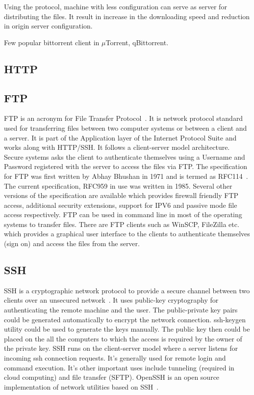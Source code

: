 {     Using the protocol, machine with less configuration can serve as
     server for distributing the files. It result in increase in the
     downloading speed and reduction in origin server configuration.

     Few popular bittorrent client in $\mu$Torrent, qBittorrent.

     \pv

\subsection{HTTP}
\subsection{FTP }

FTP is an acronym for File Transfer Protocol~\cite{www-ftp-wiki}. It
is network protocol standard used for transferring files between two
computer systems or between a client and a server. It is part of the
Application layer of the Internet Protocol Suite and works along with
HTTP/SSH. It follows a client-server model architecture. Secure
systems asks the client to authenticate themselves using a Username
and Password registered with the server to access the files via
FTP. The specification for FTP was first written by Abhay Bhushan in
1971 and is termed as RFC114~\cite{www-rfc114}. The current
specification, RFC959 in use was written in 1985. Several other
versions of the specification are available which provides firewall
friendly FTP access, additional security extensions, support for IPV6
and passive mode file access respectively. FTP can be used in command
line in most of the operating systems to transfer files. There are FTP
clients such as WinSCP, FileZilla etc. which provides a graphical user
interface to the clients to authenticate themselves (sign on) and
access the files from the server.

     \pv
     
\subsection{SSH}

SSH is a cryptographic network protocol to provide a secure channel
between two clients over an unsecured network~\cite{www-ssh-wiki}. It
uses public-key cryptography for authenticating the remote machine and
the user. The public-private key pairs could be generated
automatically to encrypt the network connection.  ssh-keygen utility
could be used to generate the keys manually.  The public key then
could be placed on the all the computers to which the access is
required by the owner of the private key.  SSH runs on the
client-server model where a server listens for incoming ssh connection
requests. It's generally used for remote login and command
execution. It's other important uses include tunneling (required in
cloud computing) and file transfer (SFTP).  OpenSSH is an open source
implementation of network utilities based on
SSH~\cite{www-openssh-wiki}.

}
